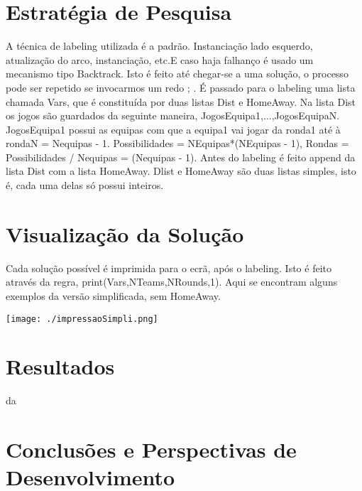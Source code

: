 \documentclass[runningheads,a4paper]{llncs}
\begin{document}
\section{Estratégia de Pesquisa}
A técnica de labeling utilizada é a padrão. Instanciação lado esquerdo, atualização do arco, instanciação, etc.E caso haja falhanço é usado um mecanismo tipo Backtrack. Isto é feito até chegar-se a uma solução, o processo pode ser repetido se invocarmos um redo ; . É passado para o labeling uma lista chamada Vars, que é constituída por duas listas Dist e HomeAway. Na lista Dist os jogos são guardados da seguinte maneira, \lbrack JogosEquipa1,...,JogosEquipaN\rbrack. JogosEquipa1 possui as equipas com que a equipa1 vai jogar da ronda1 até à rondaN = Nequipas - 1. Possibilidades = NEquipas*(NEquipas - 1), Rondas = Possibilidades / Nequipas = (Nequipas - 1). Antes do labeling é feito append da lista Dist com a lista HomeAway. Dlist e HomeAway são duas listas simples, isto é, cada uma delas só possui inteiros.

\section{Visualização da Solução}
Cada solução possível é imprimida para o ecrã, após o labeling. Isto é feito através da regra, print(Vars,NTeams,NRounds,1). Aqui se encontram alguns exemplos da versão simplificada, sem HomeAway.

\begin{center}
\texttt{[image: ./impressaoSimpli.png]}
\end{center}

\section{Resultados}
da

\section{Conclusões e Perspectivas de Desenvolvimento}
\end{document}
